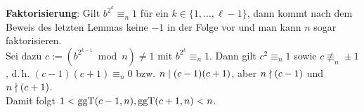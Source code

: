 \linie

\textbf{Faktorisierung}:
Gilt $b^{2^k} \equiv_n 1$ für ein $k \in \{1, \dotsc, \ell - 1\}$,
dann kommt nach dem Beweis des letzten Lemmas
keine $-1$ in der Folge vor und man kann $n$ sogar faktorisieren.\\
Sei dazu $c := (b^{2^{k-1}} \bmod n) \not= 1$ mit $b^{2^k} \equiv_n 1$.
Dann gilt $c^2 \equiv_n 1$ sowie $c \not\equiv_n \pm 1$,
d.\,h. $(c-1)(c+1) \equiv_n 0$ bzw. $n \mid (c-1)(c+1)$,
aber $n \nmid (c-1)$ und $n \nmid (c+1)$.\\
Damit folgt $1 < \operatorname{ggT}(c-1, n), \operatorname{ggT}(c+1, n) < n$.

\pagebreak
